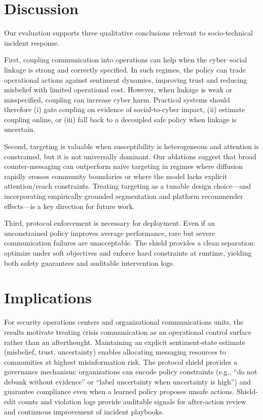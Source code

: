 \documentclass[sn-basic]{sn-jnl}
\begin{document}
\section{Discussion}
Our evaluation supports three qualitative conclusions relevant to socio-technical incident response.

First, coupling communication into operations can help when the cyber--social linkage is strong and correctly specified. In such regimes, the policy can trade operational actions against sentiment dynamics, improving trust and reducing misbelief with limited operational cost. However, when linkage is weak or misspecified, coupling can increase cyber harm. Practical systems should therefore (i) gate coupling on evidence of social-to-cyber impact, (ii) estimate coupling online, or (iii) fall back to a decoupled safe policy when linkage is uncertain.

Second, targeting is valuable when susceptibility is heterogeneous and attention is constrained, but it is not universally dominant. Our ablations suggest that broad counter-messaging can outperform naive targeting in regimes where diffusion rapidly crosses community boundaries or where the model lacks explicit attention/reach constraints. Treating targeting as a tunable design choice---and incorporating empirically grounded segmentation and platform recommender effects---is a key direction for future work.

Third, protocol enforcement is necessary for deployment. Even if an unconstrained policy improves average performance, rare but severe communication failures are unacceptable. The shield provides a clean separation: optimize under soft objectives and enforce hard constraints at runtime, yielding both safety guarantees and auditable intervention logs.

\section{Implications}
For security operations centers and organizational communications units, the results motivate treating crisis communication as an operational control surface rather than an afterthought. Maintaining an explicit sentiment-state estimate (misbelief, trust, uncertainty) enables allocating messaging resources to communities at highest misinformation risk. The protocol shield provides a governance mechanism: organizations can encode policy constraints (e.g., ``do not debunk without evidence'' or ``label uncertainty when uncertainty is high'') and guarantee compliance even when a learned policy proposes unsafe actions. Shield-edit counts and violation logs provide auditable signals for after-action review and continuous improvement of incident playbooks.
\end{document}
